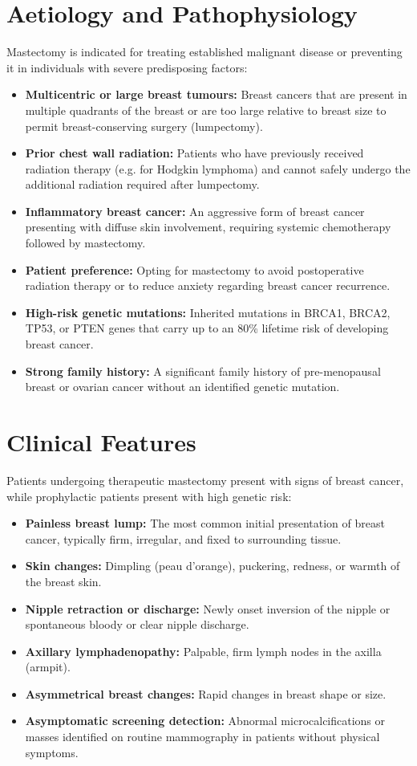 \section*{Aetiology and Pathophysiology}
Mastectomy is indicated for treating established malignant disease or preventing it in individuals with severe predisposing factors:
\begin{itemize}
    \item \textbf{Multicentric or large breast tumours:} Breast cancers that are present in multiple quadrants of the breast or are too large relative to breast size to permit breast-conserving surgery (lumpectomy).
    \item \textbf{Prior chest wall radiation:} Patients who have previously received radiation therapy (e.g. for Hodgkin lymphoma) and cannot safely undergo the additional radiation required after lumpectomy.
    \item \textbf{Inflammatory breast cancer:} An aggressive form of breast cancer presenting with diffuse skin involvement, requiring systemic chemotherapy followed by mastectomy.
    \item \textbf{Patient preference:} Opting for mastectomy to avoid postoperative radiation therapy or to reduce anxiety regarding breast cancer recurrence.
    \item \textbf{High-risk genetic mutations:} Inherited mutations in BRCA1, BRCA2, TP53, or PTEN genes that carry up to an 80\% lifetime risk of developing breast cancer.
    \item \textbf{Strong family history:} A significant family history of pre-menopausal breast or ovarian cancer without an identified genetic mutation.
\end{itemize}

\section*{Clinical Features}
Patients undergoing therapeutic mastectomy present with signs of breast cancer, while prophylactic patients present with high genetic risk:
\begin{itemize}
    \item \textbf{Painless breast lump:} The most common initial presentation of breast cancer, typically firm, irregular, and fixed to surrounding tissue.
    \item \textbf{Skin changes:} Dimpling (peau d'orange), puckering, redness, or warmth of the breast skin.
    \item \textbf{Nipple retraction or discharge:} Newly onset inversion of the nipple or spontaneous bloody or clear nipple discharge.
    \item \textbf{Axillary lymphadenopathy:} Palpable, firm lymph nodes in the axilla (armpit).
    \item \textbf{Asymmetrical breast changes:} Rapid changes in breast shape or size.
    \item \textbf{Asymptomatic screening detection:} Abnormal microcalcifications or masses identified on routine mammography in patients without physical symptoms.
\end{itemize}

